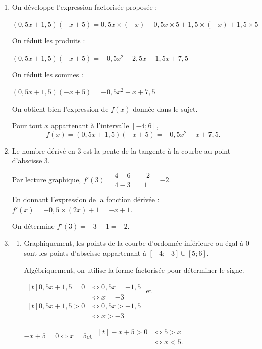 \begin{enumerate}
	\item On développe l'expression factorisée proposée :

	$(0,5x + 1,5)(-x+5) = 0,5x \times (-x) + 0,5x \times 5 + 1,5 \times (-x) + 1,5 \times 5 $

	On réduit les produits :

	$(0,5x + 1,5)(-x+5) = -0,5x^2 + 2,5x - 1,5x + 7,5 $

	On réduit les sommes :

	$(0,5x + 1,5)(-x+5) = -0,5x^2 + x + 7,5 $

	On obtient bien l'expression de $f(x)$ donnée dans le sujet.

	Pour tout $x$ appartenant à l'intervalle $[-4 ; 6]$,
	\[
	f(x)=(0,5x + 1,5)(-x+5) = -0,5x^2 +  x + 7,5.
	\]

	\item Le nombre dérivé en 3 est la pente de la tangente à la courbe au point d'abscisse 3.

	Par lecture graphique, \quad $f'(3) = \dfrac{4 - 6}{4 - 3} = \dfrac{-2}{1} = -2$.

	En donnant l'expression de la fonction dérivée : \quad $f'(x) = -0,5 \times (2x) + 1 = -x+1$.

	On détermine \quad $f'(3) = -3  + 1 = -2$.


	\item \begin{enumerate}
		\item Graphiquement, les points de la courbe d'ordonnée inférieure ou égal à 0 sont les points d'abscisse appartenant à $\left[-4 ; -3\right]\cup\left[5 ; 6\right]$.

		Algébriquement, on utilise la forme factorisée pour déterminer le signe.

		$\begin{aligned}[t]
			0,5x + 1,5 = 0
			&\iff 0,5x = -1,5 \\
			&\iff x = -3
		\end{aligned}$
		\quad et \quad
		$\begin{aligned}[t]
			0,5x + 1,5 > 0
			&\iff 0,5x > -1,5 \\
			&\iff x > -3
		\end{aligned}$

		$-x+5 = 0 \iff x = 5$\quad  et  \quad $\begin{aligned}[t]
			-x+5 > 0 &\iff 5 > x \\&\iff x < 5.
		\end{aligned}$


\end{enumerate}
\end{enumerate}
